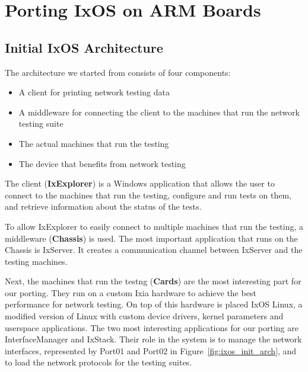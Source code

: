 \section{Porting IxOS on ARM Boards}

\subsection{Initial IxOS Architecture}

\begin{figure*}
    \centering
    \def\svgscale{0.95}
    
    \caption{Initial IxOS architecture}
    \label{fig:ixos_init_arch}
\end{figure*}

The architecture we started from consists of four components:
\begin{itemize}
    \item A client for printing network testing data
    \item A middleware for connecting the client to the machines that run the
    network testing suite
    \item The actual machines that run the testing
    \item The device that benefits from network testing
\end{itemize}

The client (\textbf{IxExplorer}) is a Windows application that allows the user to
connect to the machines that run the testing, configure and run tests on them,
and retrieve information about the status of the tests.

To allow IxExplorer to easily connect to multiple machines that run the testing,
a middleware (\textbf{Chassis}) is used. The most important application that runs on
the Chassis is IxServer. It creates a communication channel between IxServer and
the testing machines.

Next, the machines that run the testng (\textbf{Cards}) are the most interesting part
for our porting. They run on a custom Ixia hardware to achieve the best
performance for network testing. On top of this hardware is placed IxOS Linux,
a modified version of Linux with custom device drivers, kernel parameters and
userspace applications. The two most interesting applications for our porting
are InterfaceManager and IxStack. Their role in the system is to manage the
network interfaces, represented by Port01 and Port02 in Figure~\ref{fig:ixos_init_arch},
and to load the network protocols for the testing suites.

